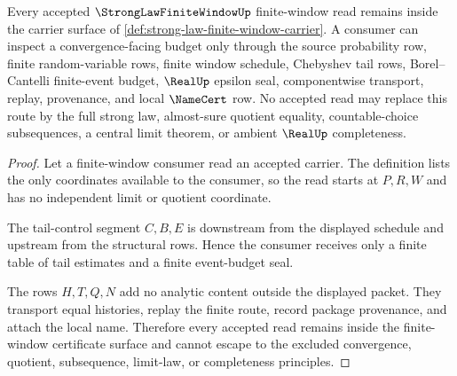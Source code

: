\begin{theorem}\label{thm:strong-law-finite-window-nonescape}
Every accepted $\StrongLawFiniteWindowUp$ finite-window read remains inside the carrier surface of \autoref{def:strong-law-finite-window-carrier}. A consumer can inspect a convergence-facing budget only through the source probability row, finite random-variable rows, finite window schedule, Chebyshev tail rows, Borel--Cantelli finite-event budget, $\RealUp$ epsilon seal, componentwise transport, replay, provenance, and local $\NameCert$ row. No accepted read may replace this route by the full strong law, almost-sure quotient equality, countable-choice subsequences, a central limit theorem, or ambient $\RealUp$ completeness.
\end{theorem}
\begin{proof}
Let a finite-window consumer read an accepted carrier. The definition lists the only coordinates available to the consumer, so the read starts at $P,R,W$ and has no independent limit or quotient coordinate.

The tail-control segment $C,B,E$ is downstream from the displayed schedule and upstream from the structural rows. Hence the consumer receives only a finite table of tail estimates and a finite event-budget seal.

The rows $H,T,Q,N$ add no analytic content outside the displayed packet. They transport equal histories, replay the finite route, record package provenance, and attach the local name. Therefore every accepted read remains inside the finite-window certificate surface and cannot escape to the excluded convergence, quotient, subsequence, limit-law, or completeness principles.
\end{proof}



